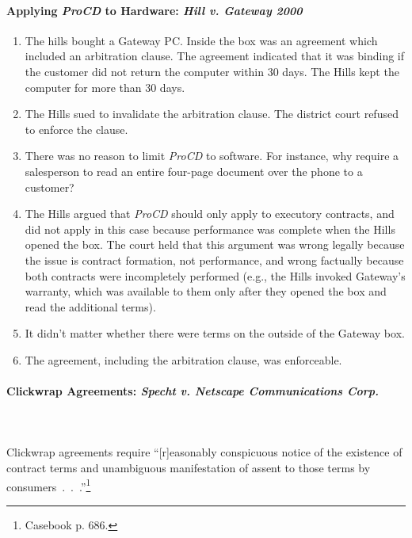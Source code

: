 \paragraph{Applying \emph{ProCD} to Hardware: \emph{Hill v. Gateway 2000}}

\begin{enumerate}
    \item The hills bought a Gateway PC. Inside the box was an agreement which 
    included an arbitration clause. The agreement indicated that it was 
    binding if the customer did not return the computer within 30 days. The 
    Hills kept the computer for more than 30 days.
    \item The Hills sued to invalidate the arbitration clause. The district 
    court refused to enforce the clause.
    \item There was no reason to limit \emph{ProCD} to software. For instance, 
    why require a salesperson to read an entire four-page document over the 
    phone to a customer?
    \item The Hills argued that \emph{ProCD} should only apply to executory 
    contracts, and did not apply in this case because performance was complete 
    when the Hills opened the box. The court held that this argument was wrong 
    legally because the issue is contract formation, not performance, and 
    wrong factually because both contracts were incompletely performed (e.g., 
    the Hills invoked Gateway's warranty, which was available to them only 
    after they opened the box and read the additional terms).
    \item It didn't matter whether there were terms on the outside of the 
    Gateway box.
    \item The agreement, including the arbitration clause, was enforceable.
\end{enumerate}

\paragraph{Clickwrap Agreements: \emph{Specht v. Netscape Communications 
Corp.}}
~\\\\
Clickwrap agreements require ``[r]easonably conspicuous notice of the 
existence of contract terms and unambiguous manifestation of assent to those 
terms by consumers~.~.~.''\footnote{Casebook p. 686.}

